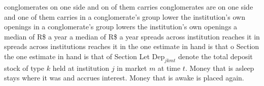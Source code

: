 conglomerates on one side and on of them carries
conglomerates are on one side and one of them carries
in a conglomerate's group lower the institution's own openings
in a conglomerate's group lowers the institution's own openings
a median of R\$ a year
a median of R\$ a year
spreads across institution reaches it in
spreads across institutions reaches it in
the one estimate in hand is that o Section
the one estimate in hand is that of Section
Let $\mathrm{Dep}_{jkmt}$ denote the total deposit stock of type $k$ held at institution $j$ in market $m$ at time $t$. Money that is asleep stays where it was and accrues interest. Money that is awake is placed again. %

